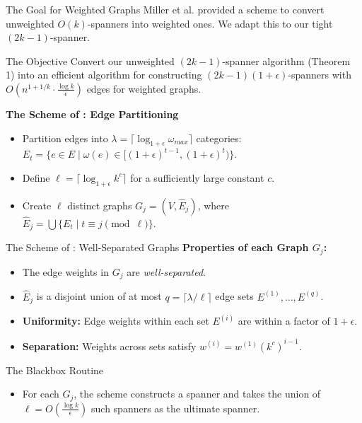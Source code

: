 \documentclass{beamer}
\begin{document}
\begin{frame}{The Goal for Weighted Graphs}
    Miller et al. \cite{MPVX15} provided a scheme to convert unweighted $O(k)$-spanners into weighted ones. We adapt this to our tight $(2k-1)$-spanner.
    
    \vspace{0.3cm}
    \begin{block}{The Objective}
        Convert our unweighted $(2k - 1)$-spanner algorithm (Theorem 1) into an efficient algorithm for constructing $(2k - 1)(1 + \epsilon)$-spanners with $O(n^{1+1/k} \cdot \frac{\log k}{\epsilon})$ edges for weighted graphs.
    \end{block}
    
    \vspace{0.3cm}
    \textbf{The Scheme of \cite{MPVX15}: Edge Partitioning}
    \begin{itemize}
        \item Partition edges into $\lambda = \lceil \log_{1+\epsilon} \omega_{max} \rceil$ categories: $E_t = \{e \in E \mid \omega(e) \in [(1+\epsilon)^{t-1}, (1+\epsilon)^t)\}$.
        \item Define $\ell = \lceil \log_{1+\epsilon} k^c \rceil$ for a sufficiently large constant $c$.
        \item Create $\ell$ distinct graphs $G_j = (V, \hat{E}_j)$, where $\hat{E}_j = \bigcup \{E_t \mid t \equiv j \pmod \ell\}$.
    \end{itemize}
\end{frame}

\begin{frame}{The Scheme of \cite{MPVX15}: Well-Separated Graphs}
    \textbf{Properties of each Graph $G_j$:}
    \begin{itemize}
        \item The edge weights in $G_j$ are \textit{well-separated}. 
        \item $\hat{E}_j$ is a disjoint union of at most $q = \lceil \lambda / \ell \rceil$ edge sets $E^{(1)}, \dots, E^{(q)}$.
        \item \textbf{Uniformity:} Edge weights within each set $E^{(i)}$ are within a factor of $1 + \epsilon$.
        \item \textbf{Separation:} Weights across sets satisfy $w^{(i)} = w^{(1)} (k^c)^{i-1}$.
    \end{itemize}
    
    \vspace{0.2cm}
    \begin{block}{The Blackbox Routine}
        \begin{itemize}
            \item For each $G_j$, the scheme constructs a spanner and takes the union of $\ell = O(\frac{\log k}{\epsilon})$ such spanners as the ultimate spanner.
        \end{itemize}
    \end{block}
\end{frame}
\end{document}
